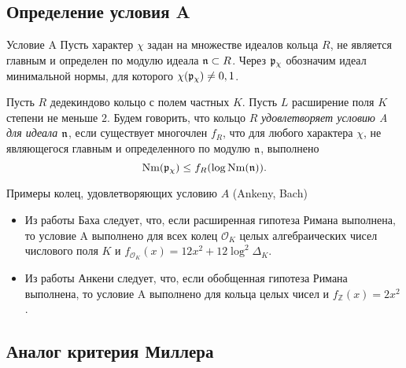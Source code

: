 \documentclass[8pt, xcolor=x11names]{beamer}
\begin{document}
\subsection{Определение условия A}

\begin{frame}
    \begin{block}{Условие A}
        Пусть характер $\chi$ задан на множестве идеалов кольца $R$, не является главным и определен по модулю идеала $\mathfrak{n} \subset R$.
        Через $\mathfrak{p}_{\chi}$ обозначим идеал минимальной нормы, для которого $\chi(\mathfrak{p}_{\chi}) \neq 0, 1$.
    
        Пусть $R$ дедекиндово кольцо с полем частных $K$.
        Пусть $L$ расширение поля $K$ степени не меньше $2$.
        Будем говорить, что кольцо $R$ \emph{удовлетворяет условию A для идеала $\mathfrak{n}$}, если существует многочлен $f_R$, что для любого характера $\chi$, не являющегося главным и определенного по модулю $\mathfrak{n}$, выполнено
        \begin{equation*}
            \textrm{Nm}(\mathfrak{p}_{\chi}) \le f_R(\log{\textrm{Nm}(\mathfrak{n})}).
        \end{equation*}
    \end{block}

    \begin{block}{Примеры колец, удовлетворяющих условию $A$ (Ankeny, Bach)}
        \begin{itemize}
            \item Из работы Баха следует, что, если расширенная гипотеза Римана выполнена, то условие A выполнено для всех колец $\mathcal{O}_K$ целых алгебраических чисел числового поля $K$ и $f_{\mathcal{O}_K}(x) = 12x^2 + 12\log^2 \Delta_{K}$.

            \item Из работы Анкени следует, что, если обобщенная гипотеза Римана выполнена, то условие A выполнено для кольца целых чисел и $f_{\mathbb{Z}}(x) = 2x^2$.
        \end{itemize}
    \end{block}
\end{frame}

\subsection{Аналог критерия Миллера}
\end{document}
